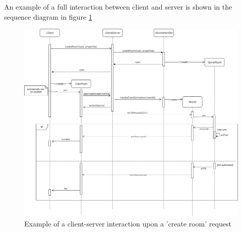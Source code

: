 An example of a full interaction between client and server is shown in the sequence diagram in figure \ref{fig:create_room_seq}
\begin{figure}[]
	\hspace*{-1in}
	\includegraphics[scale=0.5]{images/4-design/crate_room_seq.png}
	\caption{Example of a client-server interaction upon a 'create room' request}
	\label{fig:create_room_seq}
\end{figure}